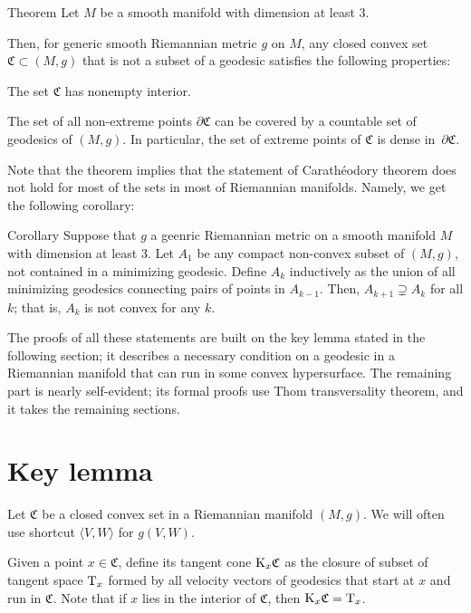 \documentclass[a4paper,10pt]{article}
\begin{document}
\begin{thm}{Theorem}\label{thm:main}
Let $M$ be a smooth manifold with dimension at least 3.

Then, for generic smooth Riemannian metric $g$ on $M$,
any closed convex set $\mathfrak{C}\subset (M,g)$ that is not a subset of a geodesic
satisfies the following properties:

\begin{subthm}{}
The set $\mathfrak{C}$ has nonempty interior.
\end{subthm}

\begin{subthm}{}
The set of all non-extreme points $\partial\mathfrak{C}$ can be covered by a countable set of geodesics of $(M,g)$.
In particular, the set of extreme points of $\mathfrak{C}$ is dense in~$\partial\mathfrak{C}$.
\end{subthm}

\end{thm}

Note that the theorem implies that the statement of Carathéodory theorem does not hold for most of the sets in most of Riemannian manifolds.
Namely, we get the following corollary:

\begin{thm}{Corollary}
Suppose that $g$ a geenric Riemannian metric on a smooth manifold $M$ with dimension at least 3.
Let $A_1$ be any compact non-convex  subset of $(M,g)$, not contained in a minimizing  geodesic.
Define  $A_k$ inductively as  the union of all minimizing geodesics connecting pairs of  points in 
$A_{k-1}$.
Then, $A_{k+1}\supsetneq A_k$ for all $k$;
that is, $A_k$ is not convex for any $k$.
\end{thm}


The proofs of all these statements are built on the key lemma stated in the following section; 
it describes a necessary condition on a geodesic in a Riemannian manifold that can run in some convex hypersurface.
The remaining part is nearly self-evident;
its formal proofs use Thom transversality theorem, and it takes the remaining sections.

\section{Key lemma}

Let $\mathfrak{C}$ be a closed convex set in a Riemannian manifold $(M,g)$.
We will often use shortcut $\langle V,W\rangle$ for $g(V,W)$.

Given a point $x\in \mathfrak{C}$, define its tangent cone $\mathrm{K}_x\mathfrak{C}$ as the closure of subset of tangent space $\mathrm{T}_x$ formed by all velocity vectors of geodesics that start at $x$ and run in $\mathfrak{C}$.
Note that if $x$ lies in the interior of $\mathfrak{C}$, then $\mathrm{K}_x\mathfrak{C}=\mathrm{T}_x$.
\end{document}
